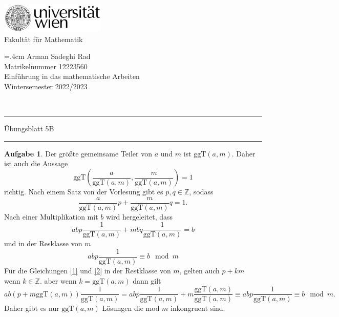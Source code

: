 \documentclass{article}
\theoremstyle{definition}
\newtheorem{ub}{Aufgabe}
\newcommand{\ggt}[2]{\mathrm{ggT}(#1,#2)}
\begin{document}
	
	\thispagestyle{plain}
	\begin{minipage}{5cm}
		\includegraphics[width=5cm]{logo}\\
		\centering
		Fakultät für Mathematik
	\end{minipage}
	\hfill
	\begin{minipage}{7cm}
		\baselineskip=.4cm
		Arman Sadeghi Rad\\
		Matrikelnummer 12223560 \\
		Einführung in das mathematische Arbeiten \\
		Wintersemester 2022/2023
	\end{minipage}\\[1mm]
	\hrule height2pt \vskip1mm
	\noindent
	Übungsblatt 5B
	\hrule height2pt \vskip1mm

\begin{ub}
	Der gr\"o\ss te gemeinsame Teiler von $ a $ und $ m $ ist 
	$ \ggt{a}{m} $. Daher ist auch die Aussage
	\[ 
	\ggt{\frac{a}{\ggt{a}{m}}}{\frac{m}{\ggt{a}{m}}} = 1 
	 \]
	richtig. Nach einem Satz von der Vorlesung gibt es $ p,q \in \mathbb{Z} $, sodass
	\[ 
	\frac{a}{\ggt{a}{m}}p + \frac{m}{\ggt{a}{m}}q = 1. \tag{1}\label{1}
	 \]
	Nach einer Multiplikation mit $ b $ wird hergeleitet, dass
	\[ 
	abp\frac{1}{\ggt{a}{m}} + mbq\frac{1}{\ggt{a}{m}} = b
	 \]
	und in der Resklasse von $ m $
	\[ 
	abp\frac{1}{\ggt{a}{m}} \equiv b \mod m \tag{2}\label{2}
	 \]
	F\"ur die Gleichungen \ref{1} und \ref{2} in der Restklasse von $ m $, gelten auch $ p + km $ wenn $ k \in \mathbb{Z} $. aber wenn 
	$ k = \ggt{a}{m} $ dann gilt
	\[ 
	ab(p + m\ggt{a}{m})\frac{1}{\ggt{a}{m}} = abp\frac{1}{\ggt{a}{m}} + m \frac{\ggt{a}{m}}{\ggt{a}{m}} 
	\equiv abp\frac{1}{\ggt{a}{m}} \equiv b \mod m. 
	 \]
	Daher gibt es nur $ \ggt{a}{m} $ L\"osungen die mod $ m $ inkongruent sind.
\end{ub}
\end{document}
